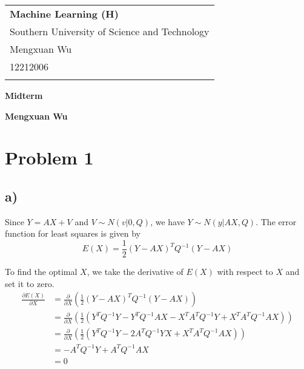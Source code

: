 \documentclass[a4paper,12pt]{article}
\newcommand{\pard}[2]{\frac{\partial #1}{\partial #2}}
\begin{document}
\thispagestyle{empty} %

\begin{tabular}{p{15.5cm}}
{\large \bf Machine Learning (H)} \\
Southern University of Science and Technology \\ Mengxuan Wu \\ 12212006 \\
\hline
\\
\end{tabular}

\vspace*{0.3cm} %

\begin{center}
	{\Large \bf Midterm}
	\vspace{2mm}

	{\bf Mengxuan Wu}
		
\end{center}  

\vspace{0.4cm}

\section*{Problem 1}

\subsection*{a)}

Since $Y = AX + V$ and $V \sim N(v|0, Q)$, we have $Y \sim N(y|AX, Q)$.
The error function for least squares is given by
\begin{equation*}
	E(X) = \frac{1}{2} (Y - AX)^T Q^{-1} (Y - AX)
\end{equation*}

To find the optimal $X$, we take the derivative of $E(X)$ with respect to $X$ and set it to zero.
\begin{align*}
	\pard{E(X)}{X} &= \pard{}{X} \left( \frac{1}{2} (Y - AX)^T Q^{-1} (Y - AX) \right) \\
	&= \pard{}{X} \left( \frac{1}{2} (Y^T Q^{-1} Y - Y^T Q^{-1} AX - X^T A^T Q^{-1} Y + X^T A^T Q^{-1} A X) \right) \\
	&= \pard{}{X} \left( \frac{1}{2} (Y^T Q^{-1} Y - 2 A^T Q^{-1} Y X + X^T A^T Q^{-1} A X) \right) \\
	&= - A^T Q^{-1} Y + A^T Q^{-1} A X \\
	&= 0
\end{align*}
\end{document}
